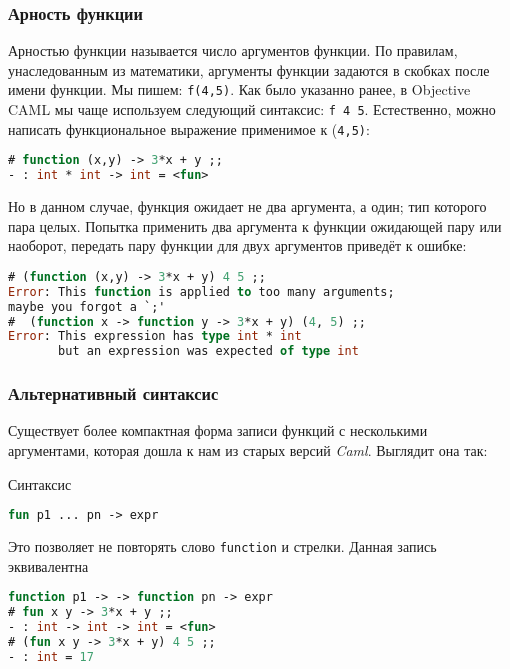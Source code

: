 \subsubsection{Арность функции}

Арностью функции называется число аргументов функции. По правилам,
унаследованным из математики, аргументы функции задаются в скобках после имени
функции. Мы пишем: \texttt{f(4,5)}. Как было указанно ранее, в Objective CAML мы
чаще используем следующий синтаксис: \texttt{f 4 5}. Естественно, можно написать
функциональное выражение применимое к (\texttt{4,5)}:

\begin{lstlisting}[language=OCaml]
# function (x,y) -> 3*x + y ;;
- : int * int -> int = <fun>
\end{lstlisting}

Но в данном случае, функция ожидает не два аргумента, а один; тип которого пара
целых. Попытка применить два аргумента к функции ожидающей пару или наоборот,
передать пару функции для двух аргументов приведёт к ошибке:

\begin{lstlisting}[language=OCaml]
# (function (x,y) -> 3*x + y) 4 5 ;;
Error: This function is applied to too many arguments;
maybe you forgot a `;'
#  (function x -> function y -> 3*x + y) (4, 5) ;;
Error: This expression has type int * int
       but an expression was expected of type int
\end{lstlisting}

\subsubsection{Альтернативный синтаксис}

Существует более компактная форма записи функций с несколькими аргументами,
которая дошла к нам из старых версий {\it Caml}. Выглядит она так:

Синтаксис 

\begin{lstlisting}[language=OCaml]
fun p1 ... pn -> expr
\end{lstlisting}

Это позволяет не повторять слово \texttt{function} и стрелки. Данная запись
эквивалентна

\begin{lstlisting}[language=OCaml]
function p1 -> -> function pn -> expr
# fun x y -> 3*x + y ;;
- : int -> int -> int = <fun>
# (fun x y -> 3*x + y) 4 5 ;;
- : int = 17
\end{lstlisting}

